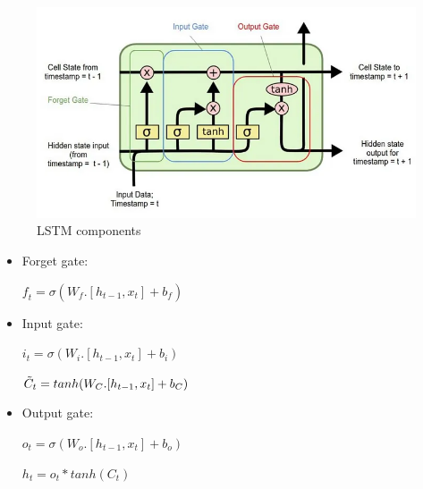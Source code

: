 \documentclass{ieeeojies}
\begin{document}
\begin{figure}[H]
	\centering
	\begin{minipage}{0.32\textwidth}
		\centering
		\includegraphics[width=1\textwidth]{bibliography/Images/LSTM_Img2.png}
		\caption{LSTM components}
		\label{fig:1}
	\end{minipage}
\end{figure}
\begin{itemize}
	\item  Forget gate: 
	\newline \centerline{$\textit{f}_{t} = \sigma (\textit{W}_{\textit{f}}.[h_{t-1},x_{t}] + b_{\textit{f}})$}
	\item Input gate: 
	\newline \centerline{$i_{t} = \sigma(\textit{W}_{i}.[h_{t-1},x_{t}]+b_{i})$}
	\newline \centerline{$\Tilde{C}_{t} = tanh(W_{C}.[h_{t-1},x_{t}] + b_{C})$}
	\item Output gate:
	\newline \centerline{$o_{t} = \sigma(W_{o}.[h_{t-1},x_{t}] + b_{o})$}
	\newline \centerline{$h_{t} = o_{t} * tanh(C_{t})$}
\end{itemize}
\end{document}
